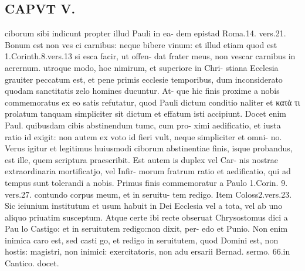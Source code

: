 \documentclass{article}
\begin{document}
\begin{pages}
\section*{CAPVT  V. }
\marginpar{[ p.375 ]}ciborum sibi indicunt propter illud Pauli in ea- dem epistad Roma.14. vers.21. Bonum est non ves ci carnibus: neque bibere vinum: et illud etiam quod est 1.Corinth.8.vers.13 si esca facir, ut offen- dat frater meus, non vescar carnibus in aerernum. utroque modo, hoc nimirum, et superiore in Chri- stiana Ecclesia grauiter peccatum est, et pene primis ecclesie temporibus, dum inconsiderato quodam sanctitatis zelo homines ducuntur. At- que hic finis proxime a nobis commemoratus ex eo satis refutatur, quod Pauli dictum conditio naliter et κατὰ τι prolatum tanquam simpliciter sit dictum et effatum isti accipiunt. Docet enim Paul. quibusdam cibis abstinendum tumc, cum pro- ximi aedificatio, et iusta ratio id exigit: non autem ex voto id fieri vult, neque simpliciter et omni- no. Verus igitur et legitimus huiusmodi ciborum abstinentiae finis, isque probandus, est ille, quem scriptura praescribit. Est autem is duplex vel Car- nis nostrae extraordinaria mortificatjo, vel Infir- morum fratrum ratio et aedificatio, qui ad tempus sunt tolerandi a nobis. Primus finis commemoratur a Paulo 1.Corin. 9. vers.27. contundo corpus meum, et in seruitu- tem redigo. Item Coloss2.vers.23. Sic ieiunium institutum et usum habuit in Dei Ecclesia vel a tota, vel ab uno aliquo priuatim susceptum. Atque certe ibi recte obseruat Chrysostomus dici a Pau lo Castigo: et in seruitutem redigo:non dixit, per- edo et Punio. Non enim inimica caro est, sed casti go, et redigo in seruitutem, quod Domini est, non hostis: magistri, non inimici: exercitatoris, non adu ersarii Bernad. sermo. 66.in Cantico. docet. 

\end{pages}
\end{document}
